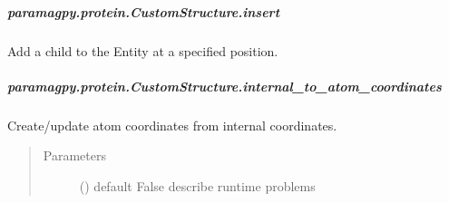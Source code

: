 \documentclass[a4paper,10pt,english,openany,oneside]{sphinxmanual}
\begin{document}
\begin{fulllineitems}
\begin{fulllineitems}
\subparagraph{paramagpy.protein.CustomStructure.insert}
\label{\detokenize{reference/generated/paramagpy.protein.CustomStructure.insert:paramagpy-protein-customstructure-insert}}\label{\detokenize{reference/generated/paramagpy.protein.CustomStructure.insert::doc}}

\begin{fulllineitems}
\label{\detokenize{reference/generated/paramagpy.protein.CustomStructure.insert:paramagpy.protein.CustomStructure.insert}}
\sphinxAtStartPar
Add a child to the Entity at a specified position.

\end{fulllineitems}



\subparagraph{paramagpy.protein.CustomStructure.internal\_to\_atom\_coordinates}
\label{\detokenize{reference/generated/paramagpy.protein.CustomStructure.internal_to_atom_coordinates:paramagpy-protein-customstructure-internal-to-atom-coordinates}}\label{\detokenize{reference/generated/paramagpy.protein.CustomStructure.internal_to_atom_coordinates::doc}}

\begin{fulllineitems}
\label{\detokenize{reference/generated/paramagpy.protein.CustomStructure.internal_to_atom_coordinates:paramagpy.protein.CustomStructure.internal_to_atom_coordinates}}
\sphinxAtStartPar
Create/update atom coordinates from internal coordinates.
\begin{quote}\begin{description}
\item[{Parameters}] \leavevmode
\sphinxAtStartPar
{} () \textendash{} default False
describe runtime problems


\end{description}
\end{quote}
\end{fulllineitems}
\end{fulllineitems}
\end{fulllineitems}
\end{document}
